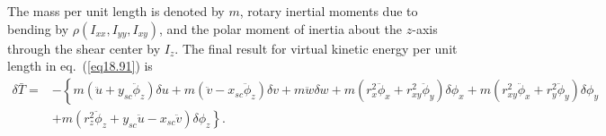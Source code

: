 \documentclass{AeroStructure-ERJohnson}
\begin{document}
The mass per unit length is denoted by $m$, rotary inertial moments due to bending by $\rho(I_{x x}, I_{y y}, I_{x y})$, and the polar moment of inertia about the $z$-axis through the shear center by $I_{z}$. The final result for virtual kinetic energy per unit length in eq.~(\ref{eq18.91}) is
\begin{align}\label{eq18.100}
\delta \bar{T} =&-\left\{m\left(\ddot{u}+y_{s c} \ddot{\phi}_{z}\right) \delta u+m\left(\ddot{v}-x_{s c} \ddot{\phi}_{z}\right) \delta v+m \ddot{w} \delta w+m\left(r_{x}^{2} \ddot{\phi}_{x}+r_{x y}^{2} \ddot{\phi}_{y}\right) \delta \phi_{x}+m\left(r_{x y}^{2} \ddot{\phi}_{x}+r_{y}^{2} \ddot{\phi}_{y}\right) \delta \phi_{y}\right.\nonumber\\ &+\left.m\left(r_{z}^{2} \ddot{\phi}_{z}+y_{s c} \ddot{u}-x_{s c} \ddot{v}\right) \delta \phi_{z}\right\}.
\end{align}
\end{document}
